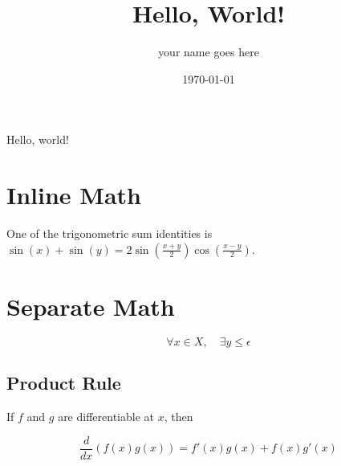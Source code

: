 \documentclass[11pt]{article}
\title{Hello, World!}
\author{your name goes here}
\date{\today}
\begin{document}
    \maketitle

    Hello, world!

    \section{Inline Math}
    One of the trigonometric sum identities is 
    \( \sin (x) + \sin (y) = 2 \sin (\frac{x+y}{2}) \cos (\frac{x-y}{2}) \).

    \section{Separate Math}
    \[ \forall x \in X, \quad \exists y \leq \epsilon  \]

    \subsection{Product Rule}
    If \(f\) and \(g\) are differentiable at \(x\), then

    \[ \frac{d}{dx}(f(x)g(x)) = f'(x)g(x) + f(x)g'(x) \]
\end{document}
